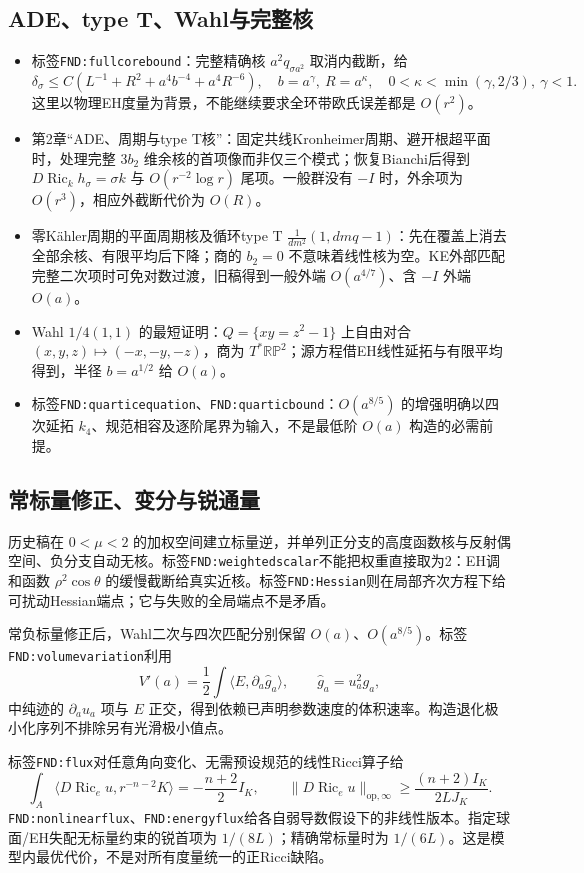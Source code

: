 \documentclass[UTF8,a4paper,11pt,fontset=fandol]{ctexart}
\numberwithin{equation}{section}
\theoremstyle{definition}
\newcommand{\Ric}{\operatorname{Ric}}
\newcommand{\op}{\mathrm{op}}
\begin{document}
\subsection{ADE、type T、Wahl与完整核}
\begin{itemize}
\item 标签\texttt{FND:fullcorebound}：完整精确核 $a^2q_{\sigma a^2}$ 取消内截断，给
\[
\delta_\sigma\le C(L^{-1}+R^2+a^4b^{-4}+a^4R^{-6}),
\quad b=a^\gamma,\ R=a^\kappa,
\quad0<\kappa<\min(\gamma,2/3),\ \gamma<1.
\]
这里以物理EH度量为背景，不能继续要求全环带欧氏误差都是 $O(r^2)$。
\item 第2章“ADE、周期与type T核”：固定共线Kronheimer周期、避开根超平面时，处理完整 $3b_2$ 维余核的首项像而非仅三个模式；恢复Bianchi后得到 $D\Ric_kh_\sigma=\sigma k$ 与 $O(r^{-2}\log r)$ 尾项。一般群没有 $-I$ 时，外余项为 $O(r^3)$，相应外截断代价为 $O(R)$。
\item 零K\"ahler周期的平面周期核及循环type T
$\frac1{dm^2}(1,dmq-1)$：先在覆盖上消去全部余核、有限平均后下降；商的 $b_2=0$ 不意味着线性核为空。KE外部匹配完整二次项时可免对数过渡，旧稿得到一般外端 $O(a^{4/7})$、含 $-I$ 外端 $O(a)$。
\item Wahl $1/4(1,1)$ 的最短证明：$Q=\{xy=z^2-1\}$ 上自由对合 $(x,y,z)\mapsto(-x,-y,-z)$，商为 $T^*\mathbb{RP}^2$；源方程借EH线性延拓与有限平均得到，半径 $b=a^{1/2}$ 给 $O(a)$。
\item 标签\texttt{FND:quarticequation}、\texttt{FND:quarticbound}：$O(a^{8/5})$ 的增强明确以四次延拓 $k_4$、规范相容及逐阶尾界为输入，不是最低阶 $O(a)$ 构造的必需前提。
\end{itemize}

\subsection{常标量修正、变分与锐通量}
历史稿在 $0<\mu<2$ 的加权空间建立标量逆，并单列正分支的高度函数核与反射偶空间、负分支自动无核。标签\texttt{FND:weightedscalar}不能把权重直接取为2：EH调和函数 $\rho^2\cos\theta$ 的缓慢截断给真实近核。标签\texttt{FND:Hessian}则在局部齐次方程下给可扰动Hessian端点；它与失败的全局端点不是矛盾。

常负标量修正后，Wahl二次与四次匹配分别保留 $O(a)$、$O(a^{8/5})$。标签\texttt{FND:volumevariation}利用
\[
V'(a)=\frac12\int\langle E,\partial_a\widehat g_a\rangle,
\qquad \widehat g_a=u_a^2g_a,
\]
中纯迹的 $\partial_a u_a$ 项与 $E$ 正交，得到依赖已声明参数速度的体积速率。构造退化极小化序列不排除另有光滑极小值点。

标签\texttt{FND:flux}对任意角向变化、无需预设规范的线性Ricci算子给
\[
\int_A\langle D\Ric_eu,r^{-n-2}K\rangle
=-\frac{n+2}{2}I_K,
\qquad
\|D\Ric_eu\|_{\op,\infty}\ge\frac{(n+2)I_K}{2LJ_K}.
\]
\texttt{FND:nonlinearflux}、\texttt{FND:energyflux}给各自弱导数假设下的非线性版本。指定球面/EH失配无标量约束的锐首项为 $1/(8L)$；精确常标量时为 $1/(6L)$。这是模型内最优代价，不是对所有度量统一的正Ricci缺陷。
\end{document}
